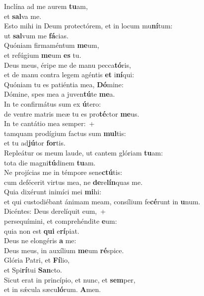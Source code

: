 \evenverse Inclína ad me aurem \textbf{tu}am,~\*\\
\evenverse et \textbf{sal}va me.\\
\oddverse Esto mihi in Deum protectórem, et in locum mu\textbf{ní}tum:~\*\\
\oddverse ut \textbf{sal}vum me \textbf{fá}cias.\\
\evenverse Quóniam firmaméntum \textbf{me}um,~\*\\
\evenverse et refúgium \textbf{me}um \textbf{es} tu.\\
\oddverse Deus meus, éripe me de manu pecca\textbf{tó}ris,~\*\\
\oddverse et de manu contra legem agéntis \textbf{et} i\textbf{ní}qui:\\
\evenverse Quóniam tu es patiéntia mea, \textbf{Dó}mine:~\*\\
\evenverse Dómine, spes mea a juven\textbf{tú}te \textbf{me}a.\\
\oddverse In te confirmátus sum ex \textbf{ú}tero:~\*\\
\oddverse de ventre matris meæ tu es pro\textbf{té}ctor \textbf{me}us.\\
\evenverse In te cantátio mea semper:~+\\
\evenverse  tamquam prodígium factus sum \textbf{mul}tis:~\*\\
\evenverse et tu ad\textbf{jú}tor \textbf{for}tis.\\
\oddverse Repleátur os meum laude, ut cantem glóriam \textbf{tu}am:~\*\\
\oddverse tota die magni\textbf{tú}dinem \textbf{tu}am.\\
\evenverse Ne projícias me in témpore sene\textbf{ctú}tis:~\*\\
\evenverse cum defécerit virtus mea, ne \textbf{de}re\textbf{lín}quas me.\\
\oddverse Quia dixérunt inimíci mei \textbf{mi}hi:~\*\\
\oddverse et qui custodiébant ánimam meam, consílium fe\textbf{cé}runt in \textbf{u}num.\\
\evenverse Dicéntes: Deus derelíquit eum,~+\\
\evenverse  persequímini, et comprehéndite \textbf{e}um:~\*\\
\evenverse quia non est \textbf{qui} e\textbf{rí}piat.\\
\oddverse Deus ne elongéris \textbf{a} me:~\*\\
\oddverse Deus meus, in auxílium \textbf{me}um \textbf{ré}spice.\\
\evenverse Glória Patri, et \textbf{Fí}lio,~\*\\
\evenverse et Spi\textbf{rí}tui \textbf{San}cto.\\
\oddverse Sicut erat in princípio, et nunc, et \textbf{sem}per,~\*\\
\oddverse et in sǽcula sæcu\textbf{ló}rum. \textbf{A}men.\\
